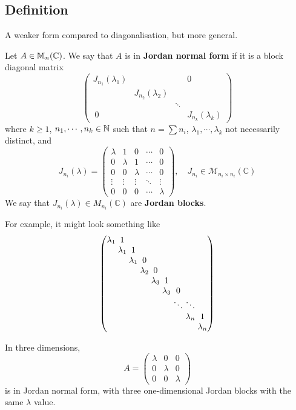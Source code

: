 \documentclass[a4paper,11pt]{article}
\begin{document}
\subsection{Definition}
A weaker form compared to diagonalisation, but more general. 
\begin{definition}
	Let \( A \in {\mathbb{M}}_n(\mathbb C) \).
	We say that \( A \) is in \textbf{Jordan normal form} if it is a block diagonal matrix
	\[
		\begin{pmatrix}
		  J_{n_1}(\lambda_1) & & & 0\\
		  & J_{n_2}(\lambda_2)\\
		  & & \ddots\\\
		  0 & & & J_{n_k} (\lambda_k)
		\end{pmatrix}
	\]
	where $k \geq 1$, $n_1, \cdots, n_k \in {\mathbb{N}}$ such that $n = \sum n_i$, $\lambda_1, \cdots, \lambda_k$ not necessarily distinct, and
	\[
		J_{n_i}(\lambda) =
		\begin{pmatrix}
			\lambda & 1       & 0       & \cdots & 0       \\
			0       & \lambda & 1       & \cdots & 0       \\
			0       & 0       & \lambda & \cdots & 0       \\
			\vdots  & \vdots  & \vdots  & \ddots & \vdots  \\
			0       & 0       & 0       & \cdots & \lambda
		\end{pmatrix},\quad J_{n_i}\in \mathcal{M}_{n_i\times n_i}(\mathbb{C})
	\]
	We say that \( J_{n_i}(\lambda) \in M_{n_i}(\mathbb C) \) are \textbf{Jordan blocks}.
\end{definition}
For example, it might look something like
\[\arraycolsep=1.4pt
  \begin{pmatrix}
    \lambda_1 & 1\\
    & \lambda_1 & 1\\
    & & \lambda_1 & 0\\
    & & & \lambda_2 & 0\\
    & & & & \lambda_3 & 1\\
    & & & & & \lambda_3 & 0\\
    & & & & & & \ddots & \ddots\\
    & & & & & & & \lambda_n & 1\\
    & & & & & & & & \lambda_n
  \end{pmatrix}
\]
\begin{remark}
	In three dimensions,
	\[
		A =
		\begin{pmatrix}
			\lambda & 0       & 0       \\
			0       & \lambda & 0       \\
			0       & 0       & \lambda
		\end{pmatrix}
	\]
	is in Jordan normal form, with three one-dimensional Jordan blocks with the same \( \lambda \) value.
\end{remark}
\end{document}
